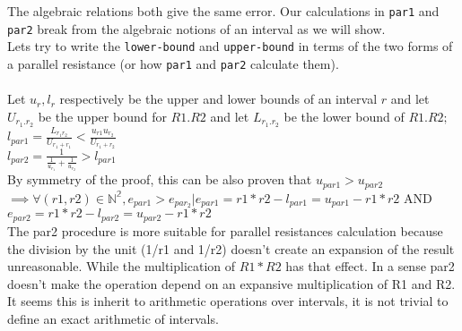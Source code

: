 \documentclass{article}
\begin{document}
\noindent The algebraic relations both give the same error. Our calculations in \texttt{par1} and \texttt{par2} break from the algebraic notions  of an interval as we will show.\\
Lets try to write the \texttt{lower-bound} and \texttt{upper-bound} in terms of the two forms of a parallel resistance (or how \texttt{par1} and \texttt{par2} calculate them).\\ \\
Let $u_{r} , l_{r}$ respectively be the upper and lower bounds of an interval $r$ and let $U_{r_1.r_2}$  be the upper bound for $R1.R2$ and let $L_{r_1.r_2}$ be the lower bound of $R1 . R2;$\\
\noindent$l_{par1} =  \frac{L_{r_1r_2}}{U_{r_1+ r_1}} < \frac{u_{r1}u_{r_2}}{U_{r_1+r_2}} $\\
\noindent$ l_{par2} = \frac{1}{\frac{1}{u_{r_1}} + \frac{1}{u_{r_2}}} > l_{par1} $\\
By symmetry of the proof, this can be also proven that $u_{par1} > u_{par2}$\\
$\implies \forall (r1,r2) \in \mathbb{N^2}, e_{par1} > e_{par_2} | e_{par1} = r1*r2 - l_{par1} = u_{par1} - r1*r2 $ AND $ e_{par2} = r1*r2 - l_{par2} = u_{par2} - r1*r2 $\\
\noindent The par2 procedure is more suitable for parallel resistances calculation because the division by the unit (1/r1 and 1/r2) doesn't create an expansion of the result unreasonable. While the multiplication of $R1*R2$ has that effect. In a sense par2 doesn't make the operation depend on an expansive multiplication of R1 and R2. It seems this is inherit to arithmetic operations over intervals, it is not trivial to define an exact arithmetic of intervals. 
\end{document}
